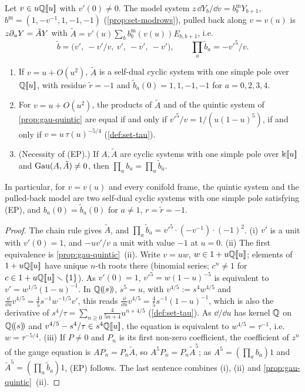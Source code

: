 \begin{prop}
\label{prop:gau-equalprod}
Let $v\in u\mathbb{Q}[\![ u ]\!]$ with $v'(0)\neq0$. The model system $z\,\dd Y_b/\dd v=b^{\mathrm m}_bY_{b+1}$, $b^{\mathrm m}=(1,-v^{-1},1,-1,-1)$ (\cref{prop:set-modrows}), pulled back along $v=v(u)$ is $z\partial_uY=\tilde AY$ with $\tilde A=v'(u)\sum_bb^{\mathrm m}_b(v(u))E_{b,b+1}$, i.e.
\[
\tilde b=\bigl(v',\ -v'/v,\ v',\ -v',\ -v'\bigr),\qquad \prod_a\tilde b_a=-v'^5/v .
\]
\begin{enumerate}
\item If $v=u+O(u^2)$, $\tilde A$ is a self-dual cyclic system with one simple pole over $\mathbb{Q}[\![ u ]\!]$, with residue $\tilde r=-1$ and $\tilde b_a(0)=1,1,-1,-1$ for $a=0,2,3,4$.
\item For $v=u+O(u^2)$, the products of $\tilde A$ and of the quintic system of \cref{prop:gau-quintic} are equal if and only if $v'^5/v=1/(u(1-u)^5)$, if and only if $v=u\,\tau(u)^{-5/4}$ (\cref{def:set-tau}).
\item (Necessity of (EP).) If $A,\tilde A$ are cyclic systems with one simple pole over $\Bbbk[\![ u ]\!]$ and $\operatorname{Gau}(A,\tilde A)\neq0$, then $\prod_ab_a=\prod_a\tilde b_a$.
\end{enumerate}
In particular, for $v=v(u)$ and every conifold frame, the quintic system and the pulled-back model are two self-dual cyclic systems with one simple pole satisfying (EP), and $b_a(0)=\tilde b_a(0)$ for $a\neq1$, $r=\tilde r=-1$.
\end{prop}

\begin{proof}
The chain rule gives $\tilde A$, and $\prod_a\tilde b_a=v'^5\cdot(-v^{-1})\cdot(-1)^2$. (i) $v'$ is a unit with $v'(0)=1$, and $-uv'/v$ a unit with value $-1$ at $u=0$. (ii) The first equivalence is \cref{prop:gau-quintic}~(ii). Write $v=uw$, $w\in1+u\mathbb{Q}[\![ u ]\!]$; elements of $1+u\mathbb{Q}[\![ u ]\!]$ have unique $n$-th roots there (binomial series; $c^n\neq1$ for $c\in1+u\mathbb{Q}[\![ u ]\!]\smallsetminus\{1\}$). As $v'(0)=1$, $v'^5=w(1-u)^{-5}$ is equivalent to $v'=w^{1/5}(1-u)^{-1}$. In $\mathbb{Q}(\!(s)\!)$, $s^5=u$, with $v^{4/5}:=s^4w^{4/5}$ and $\frac{\dd}{\dd u}v^{4/5}=\frac45s^{-1}w^{-1/5}v'$, this reads $\frac{\dd}{\dd u}v^{4/5}=\frac45s^{-1}(1-u)^{-1}$, which is also the derivative of $s^4/\tau=\sum_{n\geq0}\frac4{5n+4}u^{n+4/5}$ (\cref{def:set-tau}). As $\dd/\dd u$ has kernel $\mathbb{Q}$ on $\mathbb{Q}(\!(s)\!)$ and $v^{4/5}-s^4/\tau\in s^4\mathbb{Q}[\![ u ]\!]$, the equation is equivalent to $w^{4/5}=\tau^{-1}$, i.e.\ $w=\tau^{-5/4}$. (iii) If $P\neq0$ and $P_n$ is its first non-zero coefficient, the coefficient of $z^n$ of the gauge equation is $AP_n=P_n\tilde A$, so $A^5P_n=P_n\tilde A^5$; as $A^5=(\prod_ab_a)1$ and $\tilde A^5=(\prod_a\tilde b_a)1$, (EP) follows. The last sentence combines (i), (ii) and \cref{prop:gau-quintic}~(ii).
\end{proof}

